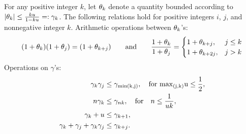 \begin{lemma}
	\label{lem:up}
	For any positive integer $k$, let $\theta_{k}$ denote a quantity bounded according to $|\theta_{k}|\leq \frac{k u }{1-ku} =:\gamma_{k}$. The following relations hold for positive integers $i$, $j$, and nonnegative integer $k$.
	Arithmetic operations between $\theta_{k}$'s: 
	\begin{equation}
	(1+\theta_{k})(1+\theta_{j})
	=(1+\theta_{k+j}) 
	\qquad \mbox{and} \qquad
	\frac{1+\theta_{k}}{1+\theta_{j}} 
	=
	\begin{cases}
	1+\theta_{k+j},& j \leq k\\
	1+\theta_{k+2j},& j > k\\
	\end{cases} 
	\end{equation}
	Operations on $\gamma$'s: 
	\begin{align*}
	\gamma_{k}\gamma_{j} &\leq \gamma_{\rm{min}(k,j)}, \quad\text{for } \rm{max}_{(j,k)} u \leq \frac{1}{2}, \\
	n\gamma_{k} &\leq \gamma_{nk}, \quad \mbox{for} \quad n \leq \frac{1}{uk},\\
	\gamma_{k} + u &\leq \gamma_{k+1}, \\ 
	\gamma_{k}+\gamma_{j}+\gamma_{k}\gamma_{j} & \leq \gamma_{k+j}.
	\end{align*}
\end{lemma}
